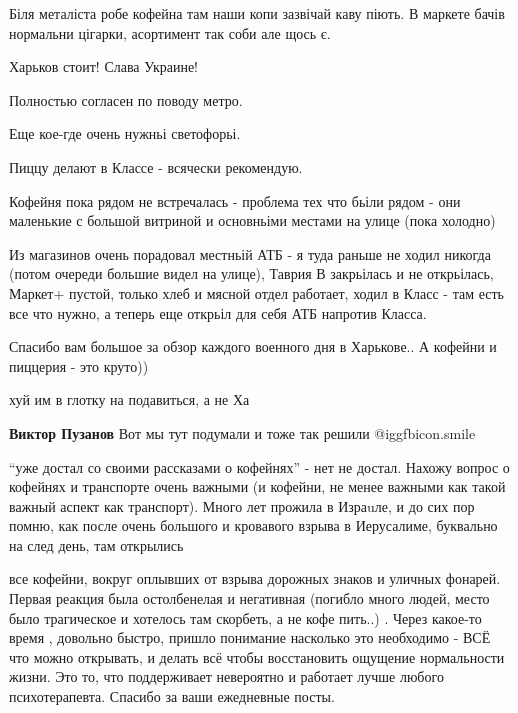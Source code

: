  
 
 
 
 
\zzSecCmt

\begin{itemize} %

Біля металіста робе кофейна там наши копи зазвічай каву піють. В маркете бачів
нормальни цігарки, асортимент так соби але щось є.

Харьков стоит!
Слава Украине!

Полностью согласен по поводу метро.

Еще кое-где очень нужньі светофорьі.

Пиццу делают в Классе - всячески рекомендую.

Кофейня пока рядом не встречалась - проблема тех что бьіли рядом - они
маленькие с большой витриной и основньіми местами на улице (пока холодно)

Из магазинов очень порадовал местньій АТБ - я туда раньше не ходил никогда
(потом очереди большие видел на улице), Таврия В закрьілась и не открьілась,
Маркет+ пустой, только хлеб и мясной отдел работает, ходил в Класс - там есть
все что нужно, а теперь еще открьіл для себя АТБ напротив Класса.


Спасибо вам большое за обзор каждого военного дня в Харькове.. А кофейни и
пиццерия - это круто))

хуй им в глотку на подавиться, а не Ха

\textbf{Виктор Пузанов} Вот мы тут подумали и тоже так решили  @igg{fbicon.smile} 


\enquote{уже достал со своими рассказами о кофейнях} - нет не достал. Нахожу вопрос о
кофейнях и транспорте очень важными (и кофейни, не менее важными как такой
важный аспект как транспорт). Много лет прожила в Израuле, и до сих пор помню,
как после очень большого и кровавого взрыва в Иерусалиме, буквально на след
день, там открылись

все кофейни, вокруг оплывших от взрыва дорожных знаков и уличных фонарей.
Первая реакция была остолбенелая и негативная (погибло много людей, место было
трагическое и хотелось там скорбеть, а не кофе пить..) . Через какое-то время ,
довольно быстро, пришло понимание насколько это необходимо - ВСЁ что можно
открывать, и делать всё чтобы восстановить ощущение нормальности жизни. Это то,
что поддерживает невероятно и работает лучше любого психотерапевта. Спасибо за
ваши ежедневные посты.


\end{itemize}
